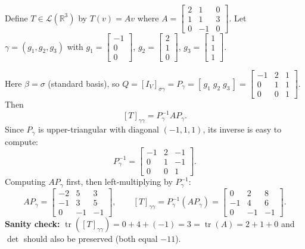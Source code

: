 \begin{examplebox}[title={Worked Example (Tutorial 7, Question 7 style): similarity via $P^{-1}AP$ in $\mathbb{R}^3$}]
Define $T\in\mathcal{L}(\mathbb{R}^3)$ by $T(v)=Av$ where
$A=\begin{bmatrix}2&1&0\\1&1&3\\0&-1&0\end{bmatrix}$.
Let $\gamma=(g_1,g_2,g_3)$ with
$g_1=\begin{bmatrix}-1\\0\\0\end{bmatrix}$, $g_2=\begin{bmatrix}2\\1\\0\end{bmatrix}$, $g_3=\begin{bmatrix}1\\1\\1\end{bmatrix}$.

Here $\beta=\sigma$ (standard basis), so $Q=[I_V]_{\sigma\gamma}=P_\gamma=[\,g_1\;g_2\;g_3\,]=\begin{bmatrix}-1&2&1\\0&1&1\\0&0&1\end{bmatrix}$.
Then
\[
[T]_{\gamma\gamma}=P_\gamma^{-1}AP_\gamma.
\]
Since $P_\gamma$ is upper-triangular with diagonal $(-1,1,1)$, its inverse is easy to compute:
\[
P_\gamma^{-1}=\begin{bmatrix}-1&2&-1\\0&1&-1\\0&0&1\end{bmatrix}.
\]
Computing $AP_\gamma$ first, then left-multiplying by $P_\gamma^{-1}$:
\[
AP_\gamma=\begin{bmatrix}-2&5&3\\-1&3&5\\0&-1&-1\end{bmatrix},
\qquad
[T]_{\gamma\gamma}=P_\gamma^{-1}(AP_\gamma)=\begin{bmatrix}0&2&8\\-1&4&6\\0&-1&-1\end{bmatrix}.
\]
\textbf{Sanity check:} $\operatorname{tr}([T]_{\gamma\gamma})=0+4+(-1)=3=\operatorname{tr}(A)=2+1+0$ \checkmark\quad and $\det$ should also be preserved (both equal $-11$).
\end{examplebox}

